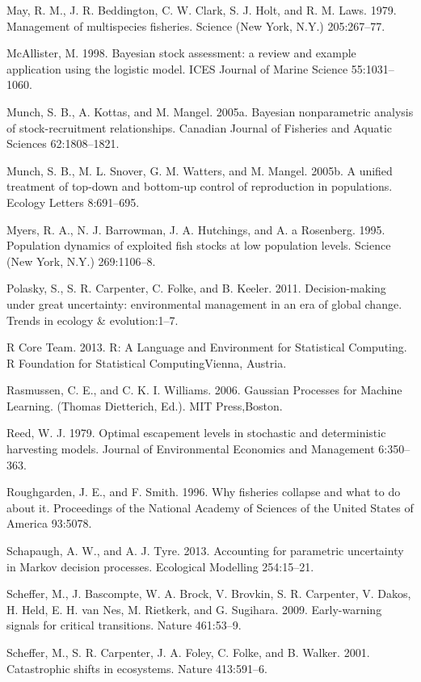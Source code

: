 \documentclass[]{components/elsarticle}
\begin{document}
May, R. M., J. R. Beddington, C. W. Clark, S. J. Holt, and R. M. Laws.
1979. Management of multispecies fisheries. Science (New York, N.Y.)
205:267--77.

McAllister, M. 1998. Bayesian stock assessment: a review and example
application using the logistic model. ICES Journal of Marine Science
55:1031--1060.

Munch, S. B., A. Kottas, and M. Mangel. 2005a. Bayesian nonparametric
analysis of stock-recruitment relationships. Canadian Journal of
Fisheries and Aquatic Sciences 62:1808--1821.

Munch, S. B., M. L. Snover, G. M. Watters, and M. Mangel. 2005b. A
unified treatment of top-down and bottom-up control of reproduction in
populations. Ecology Letters 8:691--695.

Myers, R. A., N. J. Barrowman, J. A. Hutchings, and A. a Rosenberg.
1995. Population dynamics of exploited fish stocks at low population
levels. Science (New York, N.Y.) 269:1106--8.

Polasky, S., S. R. Carpenter, C. Folke, and B. Keeler. 2011.
Decision-making under great uncertainty: environmental management in an
era of global change. Trends in ecology \& evolution:1--7.

R Core Team. 2013. R: A Language and Environment for Statistical
Computing. R Foundation for Statistical ComputingVienna, Austria.

Rasmussen, C. E., and C. K. I. Williams. 2006. Gaussian Processes for
Machine Learning. (Thomas Dietterich, Ed.). MIT Press,Boston.

Reed, W. J. 1979. Optimal escapement levels in stochastic and
deterministic harvesting models. Journal of Environmental Economics and
Management 6:350--363.

Roughgarden, J. E., and F. Smith. 1996. Why fisheries collapse and what
to do about it. Proceedings of the National Academy of Sciences of the
United States of America 93:5078.

Schapaugh, A. W., and A. J. Tyre. 2013. Accounting for parametric
uncertainty in Markov decision processes. Ecological Modelling
254:15--21.

Scheffer, M., J. Bascompte, W. A. Brock, V. Brovkin, S. R. Carpenter, V.
Dakos, H. Held, E. H. van Nes, M. Rietkerk, and G. Sugihara. 2009.
Early-warning signals for critical transitions. Nature 461:53--9.

Scheffer, M., S. R. Carpenter, J. A. Foley, C. Folke, and B. Walker.
2001. Catastrophic shifts in ecosystems. Nature 413:591--6.
\end{document}
